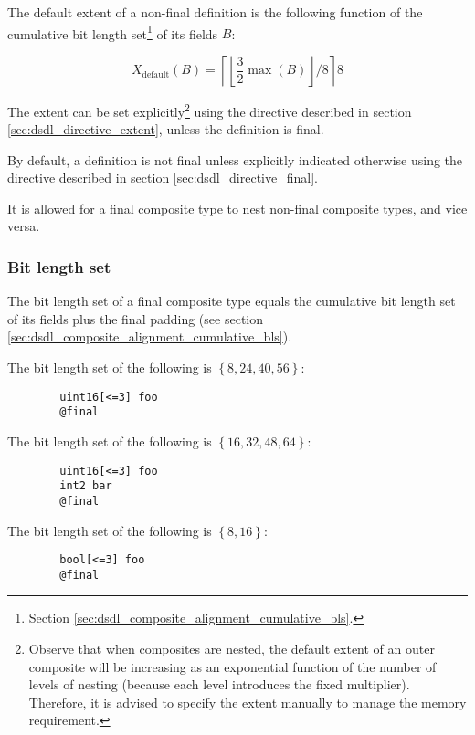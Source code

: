 The default extent of a non-final definition is the following function
of the cumulative bit length set\footnote{Section \ref{sec:dsdl_composite_alignment_cumulative_bls}.}
of its fields $B$:

$$
X_\text{default}\left(B\right) =
\left\lceil{}\left\lfloor{}\frac{3}{2} \max{}\left(B\right)\right\rfloor{}/8\right\rceil{}8
$$

The extent can be set explicitly\footnote{
    Observe that when composites are nested,
    the default extent of an outer composite will be increasing as an exponential
    function of the number of levels of nesting (because each level introduces the fixed multiplier).
    Therefore, it is advised to specify the extent manually to manage the memory requirement.
}
using the directive described in section \ref{sec:dsdl_directive_extent},
unless the definition is final.

By default, a definition is not final unless explicitly indicated otherwise using the directive described in
section \ref{sec:dsdl_directive_final}.

It is allowed for a final composite type to nest non-final composite types, and vice versa.

\subsubsection{Bit length set}

The bit length set of a final composite type equals the cumulative bit length set
of its fields plus the final padding (see section \ref{sec:dsdl_composite_alignment_cumulative_bls}).

\begin{remark}
    The bit length set of the following is $\left\{ 8, 24, 40, 56 \right\}$:
    \begin{verbatim}
        uint16[<=3] foo
        @final
    \end{verbatim}

    The bit length set of the following is $\left\{ 16, 32, 48, 64 \right\}$:
    \begin{verbatim}
        uint16[<=3] foo
        int2 bar
        @final
    \end{verbatim}

    The bit length set of the following is $\left\{ 8, 16 \right\}$:
    \begin{verbatim}
        bool[<=3] foo
        @final
    \end{verbatim}
\end{remark}

